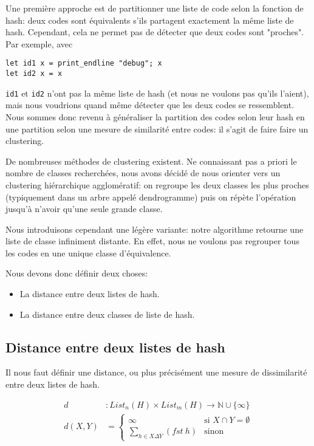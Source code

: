 
Une première approche est de partitionner une liste de code selon la fonction de hash: deux codes sont équivalents s'ils partagent exactement la même liste de hash. Cependant, cela ne permet pas de détecter que deux codes sont "proches". Par exemple, avec

\begin{verbatim}
let id1 x = print_endline "debug"; x
let id2 x = x
\end{verbatim}

\verb|id1| et \verb|id2| n'ont pas la même liste de hash (et nous ne voulons pas qu'ils l'aient), mais nous voudrions quand même détecter que les deux codes se ressemblent. Nous sommes donc revenu à généraliser la partition des codes selon leur hash en une partition selon une mesure de similarité entre codes: il s'agit de faire faire un clustering.

De nombreuses méthodes de clustering existent. Ne connaissant pas a priori le nombre de classes recherchées, nous avons décidé de nous orienter vers un clustering hiérarchique agglomératif: on regroupe les deux classes les plus proches (typiquement dans un arbre appelé dendrogramme) puis on répète l'opération jusqu'à n'avoir qu'une seule grande classe.

Nous introduisons cependant une légère variante: notre algorithme retourne une liste de classe infiniment distante. En effet, nous ne voulons pas regrouper tous les codes en une unique classe d'équivalence.

Nous devons donc définir deux choses:
\begin{itemize}
\item La distance entre deux listes de hash.
\item La distance entre deux classes de liste de hash.
\end{itemize}

\subsection{Distance entre deux listes de hash}
Il nous faut définir une distance, ou plus précisément une mesure de dissimilarité entre deux listes de hash.

\begin{align*}
d &: List_n(H) \times List_m(H) \to \mathbb{N} \cup \{\infty\} \\
d (X,Y) &=
\begin{cases}
	\infty & \text{si $X \cap Y = \emptyset$} \\
	\sum\limits_{h \in X \Delta Y} (fst\ h) & \text{sinon}
\end{cases}
\end{align*}

